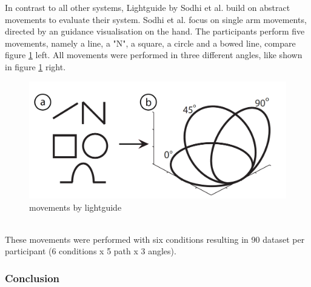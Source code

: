 In contrast to all other systems, Lightguide by Sodhi et al. \cite{Sodhi2012} build on abstract movements to evaluate their system. Sodhi et al. focus on single arm movements, directed by an guidance visualisation on the hand. The participants perform five movements, namely a line, a "N", a square, a circle and a bowed line, compare figure \ref{fig:lightguide1} left. All movements were performed in three different angles, like shown in figure \ref{fig:lightguide1} right.
\begin{figure}
	\centering
	\includegraphics[width=1.0\textwidth]{img/lightguide_movements.PNG}
	\caption{movements by lightguide \cite{Sodhi2012}}
	\label{fig:lightguide1}
\end{figure}\\
These movements were performed with six conditions resulting in 90 dataset per participant (6 conditions x 5 path x 3 angles).

\subsubsection{Conclusion}


